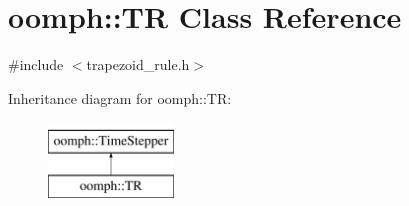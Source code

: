 \hypertarget{classoomph_1_1TR}{}\section{oomph\+:\+:TR Class Reference}
\label{classoomph_1_1TR}


{\ttfamily \#include $<$trapezoid\+\_\+rule.\+h$>$}

Inheritance diagram for oomph\+:\+:TR\+:\begin{figure}[H]
\begin{center}
\leavevmode
\includegraphics[height=2.000000cm]{classoomph_1_1TR}
\end{center}
\end{figure}
